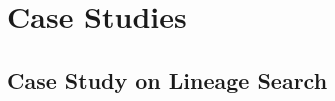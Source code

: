 \documentclass{llmxive}
\begin{document}
\section{Case Studies}
\label{app:case-studies}





\subsection{Case Study on Lineage Search}
\label{app:case-study-search-resnet}
\end{document}
